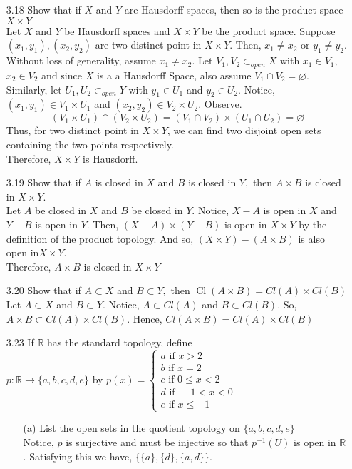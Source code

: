 \documentclass[12pt]{article}
\newcommand{\R}{\mathds{R}}
\begin{document}
\begin{enumerate}
	\item[3.18] Show that if $X$ and $Y$ are Hausdorff spaces, then so is the product space $X \times Y$\\
	Let $ X $ and $ Y $ be Hausdorff spaces and $ X \times Y $ be the product space. Suppose $ (x_1,y_1),(x_2,y_2) $ are two distinct point in $ X \times Y $. Then, $ x_1 \not = x_2 $ or $ y_1 \not = y_2 $. Without loss of generality, assume $ x_1\not = x_2 $. Let $ V_1,V_2 \subset_{open} X$ with $ x_1\in V_1 $, $ x_2\in V_2 $ and since $ X $ is a a Hausdorff Space, also assume $ V_1\cap V_2 = \varnothing $. \\
	Similarly, let $ U_1,U_2 \subset_{open} Y $ with $ y_1 \in U_1 $ and $ y_2\in U_2 $. Notice, $ (x_1,y_1)\in V_1 \times U_1 $ and $ (x_2,y_2)\in V_2\times U_2 $. Observe.
		\[(V_1 \times U_1)\cap (V_2\times U_2) = (V_1\cap V_2)\times ( U_1\cap U_2) = \varnothing\]
	Thus, for two distinct point in $ X\times Y $, we can find two disjoint open sets containing the two points respectively.\\
	Therefore, $ X\times Y $ is Hausdorff.
	\item[3.19] Show that if $A$ is closed in $X$ and $B$ is closed in $Y ,$ then $A \times B$ is closed in $X \times Y .$\\
	Let $ A $ be closed in $ X $ and $ B $ be closed in $ Y $. Notice, $ X-A $ is open in $ X $ and $ Y-B $ is open in $ Y $. Then, $ (X-A)\times(Y-B) $ is open in $ X\times Y $ by the definition of the product topology. And so, $ (X\times Y)-(A\times B) $ is also open in$ X\times Y $.\\
	Therefore, $ A\times B$ is closed in $ X\times Y $
	\item[3.20] Show that if $A \subset X$ and $B \subset Y ,$ then $\operatorname { Cl } ( A \times B ) = C l ( A ) \times C l ( B )$\\
	Let $ A \subset X $ and $ B \subset Y $. Notice, $ A\subset Cl(A) $ and $ B\subset Cl(B) $. So, $ A\times B \subset Cl(A)\times Cl(B) $. Hence, $ Cl(A\times B) = Cl(A)\times Cl(B) $

	\item[3.23] If $ \R $ has the standard topology, define \\
	$p : \mathbb { R } \rightarrow \{ a , b , c , d , e \}$ by $p ( x ) = \left\{ \begin{array} { l } { a \text { if } x > 2 } \\ { b \text { if } x = 2 } \\ { c \text { if } 0\leq x < 2 }  \\ { d \text { if } - 1 < x < 0 } \\ { e \text { if } x \leq - 1 } \end{array} \right.$
	\begin{enumerate}
		\item[(a)] List the open sets in the quotient topology on $\{ a , b , c , d , e \}$\\
		Notice, $ p $ is surjective and must be injective so that $ p^{-1}(U) $ is open in $ \R $. Satisfying this we have, $ \{\{a\},\{d\},\{a,d\}\} $.
		

\end{enumerate}
\end{enumerate}
\end{document}
